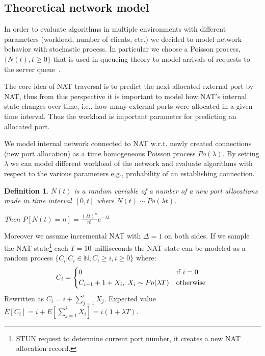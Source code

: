 \documentclass[twoside]{article}
\newtheorem{mydef}{Definition}
\begin{document}
\begin{multicols}{2}

\section{Theoretical network model}
In order to evaluate algorithms in multiple environments with different parameters (workload, number of clients, etc.)
we decided to model network behavior with stochastic process. In particular we choose a Poisson process, $\{N(t), t\geq0\}$ 
that is used in queueing theory to model arrivals of requests to the server queue~\citep{Nelson:1995:PSP:207382}. 

The core idea of NAT traversal is to predict the next allocated external port by NAT, thus from this perspective 
it is important to model how NAT's internal state changes over time, i.e., how many external ports 
were allocated in a given time interval. Thus the workload is important parameter for predicting an allocated port.

We model internal network connected to NAT w.r.t. newly created connections (new port allocation) as a 
time homogeneous Poisson process $Po(\lambda)$. By setting $\lambda$ we can model 
different workload of the network and evaluate algorithms with respect to the various parameters e.g., 
probability of an establishing connection. 


\begin{mydef}
$N(t)$ is a random variable of a number of a new port allocations made in time 
interval~$[0,t]$ where $N(t) \sim Po(\lambda t)$. \\ 
                                                      
\begin{center}                                                     
Then $P[N(t)=n] = \frac{(\lambda t)^n}{n!} e^{-\lambda t}$
\end{center}
\end{mydef}

Moreover we assume incremental NAT with $\Delta=1$ on both sides. If we sample the NAT 
state\footnote{STUN request to determine current port number, it creates a new NAT allocation record.}
each $T=10$~milliseconds the NAT state can be modeled as a random process $\{C_i | C_i \in \mathbb{N}, C_i \geq i, i\geq0\}$ where:
\[
C_i = \begin{dcases*}
         0 & if $i=0$ \\
         C_{i-1} + 1 + X_i, \; X_i \sim Po(\lambda T) & otherwise 
        \end{dcases*}
\]
Rewritten as $C_i = i + \sum_{j=1}^{i}X_j$. Expected value $E[C_i] = i + E[\sum_{j=1}^{i}X_i] = i (1+\lambda T)$.


\end{multicols}
\end{document}
